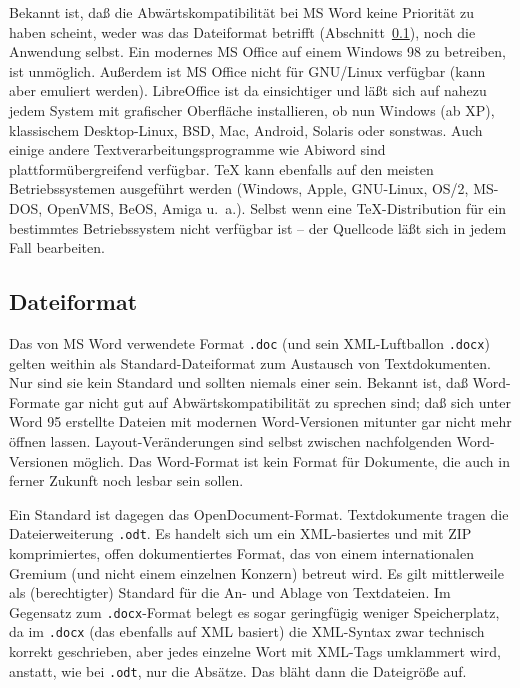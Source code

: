 \documentclass[11pt,a4paper,ngerman,DIV=8]{scrartcl}
\begin{document}
Bekannt ist, daß die Abwärtskompatibilität bei MS Word keine Priorität zu haben scheint, weder was das Dateiformat betrifft (Abschnitt~\ref{sec:dateiformat}), noch die Anwendung selbst. Ein modernes MS Office auf einem Windows 98 zu betreiben, ist unmöglich. Außerdem ist MS Office nicht für GNU/Linux verfügbar (kann aber emuliert werden). LibreOffice ist da einsichtiger und läßt sich auf nahezu jedem System mit grafischer Oberfläche installieren, ob nun Windows (ab XP), klassischem Desktop-Linux, BSD, Mac, Android, Solaris oder sonstwas. Auch einige andere Textverarbeitungsprogramme wie Abiword sind plattformübergreifend verfügbar.
\TeX{} kann ebenfalls auf den meisten Betriebssystemen ausgeführt werden (Windows, Apple, GNU-Linux, OS/2, MS-DOS, OpenVMS, BeOS, Amiga u.~a.). Selbst wenn eine \TeX{}-Distribution für ein bestimmtes Betriebssystem nicht verfügbar ist -- der Quellcode läßt sich in jedem Fall bearbeiten.

\subsection{Dateiformat}\label{sec:dateiformat}

Das von MS Word verwendete Format \texttt{.doc} (und sein XML-Luftballon \texttt{.docx}) gelten weithin als Standard-Dateiformat zum Austausch von Textdokumenten. Nur sind sie kein Standard und sollten niemals einer sein. Bekannt ist, daß Word-Formate gar nicht gut auf Abwärtskompatibilität zu sprechen sind; daß sich unter Word 95 erstellte Dateien mit modernen Word-Versionen mitunter gar nicht mehr öffnen lassen. Layout-Veränderungen sind selbst zwischen nachfolgenden Word-Versionen möglich. Das Word-Format ist kein Format für Dokumente, die auch in ferner Zukunft noch lesbar sein sollen.

Ein Standard ist dagegen das OpenDocument-Format. Textdokumente tragen die Dateierweiterung \texttt{.odt}. Es handelt sich um ein XML-basiertes und mit ZIP komprimiertes, offen dokumentiertes Format, das von einem internationalen Gremium (und nicht einem einzelnen Konzern) betreut wird. Es gilt mittlerweile als (berechtigter) Standard für die An- und Ablage von Textdateien. Im Gegensatz zum \texttt{.docx}-Format belegt es sogar geringfügig weniger Speicherplatz, da im \texttt{.docx} (das ebenfalls auf XML basiert) die XML-Syntax zwar technisch korrekt geschrieben, aber jedes einzelne Wort mit XML-Tags umklammert wird, anstatt, wie bei \texttt{.odt}, nur die Absätze. Das bläht dann die Dateigröße auf.
\end{document}
